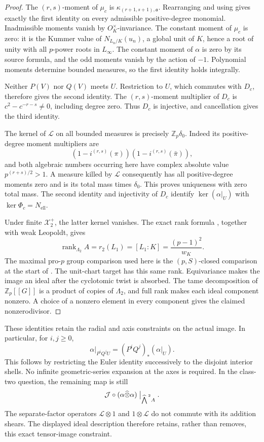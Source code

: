 \begin{proof}
The \((r,s)\)-moment of \(\mu_c\) is
\(\kappa_{(r+1,s+1),\mathfrak a}\).  Rearranging
\cite[Proposition 4.3, pp.~17--18]{IshiiSoule}
and using \cite[Theorem 2.6, p.~8]{Ishii}
gives exactly the first identity on every admissible
positive-degree monomial.  Inadmissible moments
vanish by \(O_K^\times\)-invariance.  The constant
moment of \(\mu_c\) is zero: it is the Kummer value
of \(N_{L_n/K}(u_n)\), a global unit of \(K\), hence
a root of unity with all \(p\)-power roots in
\(L_\infty\).  The constant moment of \(\alpha\)
is zero by its source formula, and the odd moments
vanish by the action of \(-1\).
Polynomial moments determine bounded measures,
so the first identity holds integrally.

Neither \(P(V)\) nor \(Q(V)\) meets \(U\).
Restriction to \(U\), which commutes with \(D_c\),
therefore gives the second identity.
The \((r,s)\)-moment multiplier of \(D_c\) is
\(c^2-c^{-r-s}\ne0\), including degree zero.
Thus \(D_c\) is injective, and cancellation gives
the third identity.

The kernel of \(\mathcal L\) on all bounded
measures is precisely \(\mathbb Z_p\delta_0\).
Indeed its positive-degree moment multipliers
are
\[
 (1-i^{(r,s)}(\pi))(1-i^{(r,s)}(\bar\pi)),
\]
and both algebraic numbers occurring here have
complex absolute value \(p^{(r+s)/2}>1\).
A measure killed by \(\mathcal L\) consequently
has all positive-degree moments zero and is its
total mass times \(\delta_0\).
This proves uniqueness with zero total mass.
The second identity and injectivity of \(D_c\)
identify \(\ker(\alpha|_U)\) with
\(\ker\Phi_c=N_{\mathrm{ell}}\).

Under finite \(\mathcal X_2^+\), the latter kernel
vanishes.  The exact rank formula
\cite[Theorem 4.4, author version p.~27]{VenjakobIwasawa},
together with weak Leopoldt, gives
\[
 \operatorname{rank}_{\Lambda_2}A
     =r_2(L_1)=[L_1:K]=\frac{(p-1)^2}{w_K}.
\]
The maximal pro-\(p\) group comparison used here
is the \((p,S)\)-closed comparison at the start of
\cite[Section 4, author version p.~26]{VenjakobIwasawa}.
The unit-chart target has this same rank.
Equivariance makes the image an ideal after the
cyclotomic twist is absorbed.  The tame
decomposition of \(\mathbb Z_p[[G]]\) is a product
of copies of \(\Lambda_2\), and full rank makes
each ideal component nonzero.  A choice of a
nonzero element in every component gives the
claimed nonzerodivisor.
\end{proof}

These identities retain the radial and axis constraints
on the actual image.  In particular, for \(i,j\geq0\),
\[
 \alpha|_{P^iQ^jU}=(P^iQ^j)_*(\alpha|_U).
\]
This follows by restricting the Euler identity
successively to the disjoint interior shells.
No infinite geometric-series expansion at the axes
is required.  In the class-two question, the remaining
map is still
\[
 \mathcal J\circ(\alpha\widehat\otimes\alpha)
              \bigm|_{\widehat{\bigwedge}^{\,2}A}.
\]
The separate-factor operators \(\mathcal L\otimes1\)
and \(1\otimes\mathcal L\) do not commute with its
addition shears.  The displayed ideal description
therefore retains, rather than removes, this exact
tensor-image constraint.
